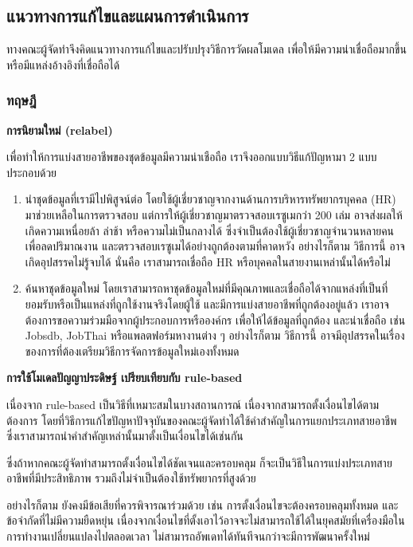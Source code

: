 \subsection{แนวทางการแก้ไขและแผนการดำเนินการ}
ทางคณะผู้จัดทำจึงคิดแนวทางการแก้ไขและปรับปรุงวิธีการวัดผลโมเดล เพื่อให้มีความน่าเชื่อถือมากขึ้น หรือมีแหล่งอ้างอิงที่เชื่อถือได้

\subsubsection{ทฤษฎี}
\textbf{การนิยามใหม่ (relabel)}

เพื่อทำให้การแบ่งสายอาชีพของชุดข้อมูลมีความน่าเชือถือ เราจึงออกแบบวิธีแก้ปัญหามา 2 แบบ ประกอบด้วย

\begin{enumerate}
    \item นำชุดข้อมูลที่เรามีไปพิสูจน์ต่อ โดยใช้ผู้เชี่ยวชาญจากงานด้านการบริหารทรัพยากรบุคคล (HR) มาช่วยเหลือในการตรวจสอบ แต่การให้ผู้เชี่ยวชาญมาตรวจสอบเรซูเมกว่า 200 เล่ม อาจส่งผลให้เกิดความเหนื่อยล้า ล่าช้า หรือความไม่เป็นกลางได้ ซึ่งจำเป็นต้องใช้ผู้เชี่ยวชาญจำนวนหลายคนเพื่อลดปริมาณงาน และตรวจสอบเรซูเมได้อย่างถูกต้องตามที่คาดหวัง อย่างไรก็ตาม วิธีการนี้ อาจเกิดอุปสรรคไม่รู้จบได้ นั่นคือ เราสามารถเชื่อถือ HR หรือบุคคลในสายงานเหล่านั้นได้หรือไม่
    \item ค้นหาชุดข้อมูลใหม่ โดยเราสามารถหาชุดข้อมูลใหม่ที่มีคุณภาพและเชื่อถือได้จากแหล่งที่เป็นที่ยอมรับหรือเป็นแหล่งที่ถูกใช้งานจริงโดยผู้ใช้ และมีการแบ่งสายอาชีพที่ถูกต้องอยู่แล้ว เราอาจต้องการขอความร่วมมือจากผู้ประกอบการหรือองค์กร เพื่อให้ได้ข้อมูลที่ถูกต้อง และน่าเชื่อถือ เช่น Jobsdb, JobThai หรือแพลตฟอร์มหางานต่าง ๆ อย่างไรก็ตาม วิธีการนี้ อาจมีอุปสรรคในเรื่องของการที่ต้องเตรียมวิธีการจัดการข้อมูลใหม่เองทั้งหมด    
\end{enumerate}

\textbf{การใช้โมเดลปัญญาประดิษฐ์ เปรียบเทียบกับ rule-based}

\par{
    เนื่องจาก rule-based เป็นวิธีที่เหมาะสมในบางสถานการณ์ เนื่องจากสามารถตั้งเงื่อนไขได้ตามต้องการ โดยที่วิธีการแก้ไขปัญหาปัจจุบันของคณะผู้จัดทำได้ใช้คำสำคัญในการแยกประเภทสายอาชีพ ซึ่งเราสามารถนำคำสำคัญเหล่านั้นมาตั้งเป็นเงื่อนไขได้เช่นกัน
}

\par{
    ซึ่งถ้าหากคณะผู้จัดทำสามารถตั้งเงื่อนไขได้ชัดเจนและครอบคลุม ก็จะเป็นวิธีในการแบ่งประเภทสายอาชีพที่มีประสิทธิภาพ รวมถึงไม่จำเป็นต้องใช้ทรัพยากรที่สูงด้วย
}

\par{
    อย่างไรก็ตาม ยังคงมีข้อเสียที่ควรพิจารณาร่วมด้วย เช่น การตั้งเงื่อนไขจะต้องครอบคลุมทั้งหมด และข้อจำกัดที่ไม่มีความยืดหยุ่น เนื่องจากเงื่อนไขที่ตั้งเอาไว้อาจจะไม่สามารถใช้ได้ในยุคสมัยที่เครื่องมือในการทำงานเปลี่ยนแปลงไปตลอดเวลา ไม่สามารถอัพเดทได้ทันทีจนกว่าจะมีการพัฒนาครั้งใหม่
}

